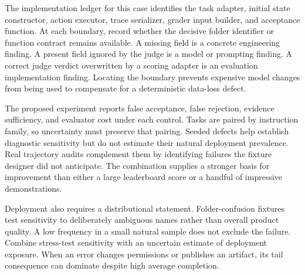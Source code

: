 The implementation ledger for this case identifies the task adapter, initial state constructor, action executor, trace serializer, grader input builder, and acceptance function. At each boundary, record whether the decisive folder identifier or function contract remains available. A missing field is a concrete engineering finding. A present field ignored by the judge is a model or prompting finding. A correct judge verdict overwritten by a scoring adapter is an evaluation implementation finding. Locating the boundary prevents expensive model changes from being used to compensate for a deterministic data-loss defect.

The proposed experiment reports false acceptance, false rejection, evidence sufficiency, and evaluator cost under each control. Tasks are paired by instruction family, so uncertainty must preserve that pairing. Seeded defects help establish diagnostic sensitivity but do not estimate their natural deployment prevalence. Real trajectory audits complement them by identifying failures the fixture designer did not anticipate. The combination supplies a stronger basis for improvement than either a large leaderboard score or a handful of impressive demonstrations.

Deployment also requires a distributional statement. Folder-confusion fixtures test sensitivity to deliberately ambiguous names rather than overall product quality. A low frequency in a small natural sample does not exclude the failure. Combine stress-test sensitivity with an uncertain estimate of deployment exposure. When an error changes permissions or publishes an artifact, its tail consequence can dominate despite high average completion.
